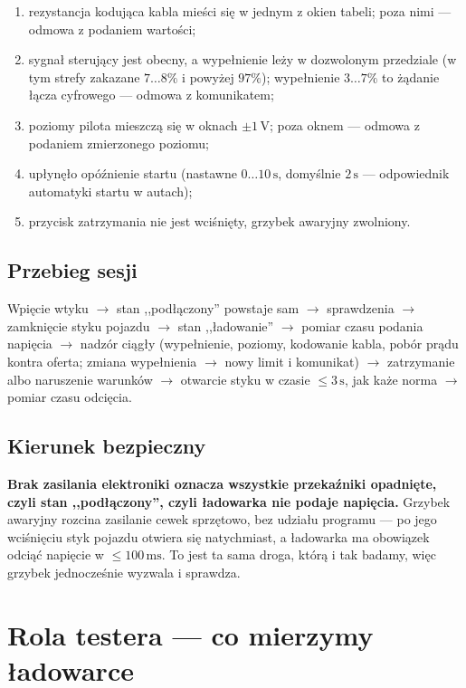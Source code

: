 \documentclass[a4paper,11pt]{article}
\newcommand{\volt}{\,\mathrm{V}}
\newcommand{\ms}{\,\mathrm{ms}}
\newcommand{\sek}{\,\mathrm{s}}
\begin{document}
\begin{enumerate}
\item rezystancja kodująca kabla mieści się w jednym z okien tabeli; poza nimi ---
      odmowa z podaniem wartości;
\item sygnał sterujący jest obecny, a wypełnienie leży w dozwolonym przedziale
      (w tym strefy zakazane $7\ldots8\%$ i powyżej $97\%$); wypełnienie
      $3\ldots7\%$ to żądanie łącza cyfrowego --- odmowa z komunikatem;
\item poziomy pilota mieszczą się w oknach $\pm1\volt$; poza oknem --- odmowa
      z podaniem zmierzonego poziomu;
\item upłynęło opóźnienie startu (nastawne $0\ldots10\sek$, domyślnie $2\sek$ ---
      odpowiednik automatyki startu w autach);
\item przycisk zatrzymania nie jest wciśnięty, grzybek awaryjny zwolniony.
\end{enumerate}

\subsection{Przebieg sesji}

Wpięcie wtyku $\rightarrow$ stan ,,podłączony'' powstaje sam $\rightarrow$
sprawdzenia $\rightarrow$ zamknięcie styku pojazdu $\rightarrow$ stan ,,ładowanie''
$\rightarrow$ pomiar czasu podania napięcia $\rightarrow$ nadzór ciągły
(wypełnienie, poziomy, kodowanie kabla, pobór prądu kontra oferta; zmiana
wypełnienia $\rightarrow$ nowy limit i komunikat) $\rightarrow$ zatrzymanie albo
naruszenie warunków $\rightarrow$ otwarcie styku w czasie $\le 3\sek$, jak każe
norma $\rightarrow$ pomiar czasu odcięcia.

\subsection{Kierunek bezpieczny}

\textbf{Brak zasilania elektroniki oznacza wszystkie przekaźniki opadnięte, czyli
stan ,,podłączony'', czyli ładowarka nie podaje napięcia.} Grzybek awaryjny
rozcina zasilanie cewek sprzętowo, bez udziału programu --- po jego wciśnięciu
styk pojazdu otwiera się natychmiast, a ładowarka ma obowiązek odciąć napięcie
w $\le100\ms$. To jest ta sama droga, którą i tak badamy, więc grzybek jednocześnie
wyzwala i sprawdza.

\section{Rola testera --- co mierzymy ładowarce}
\label{sec:tester}
\end{document}
